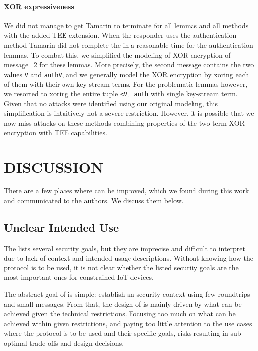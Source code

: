 \documentclass[runningheads]{llncs}
\begin{document}
\paragraph{XOR expressiveness}
We did not manage to get Tamarin to terminate for all lemmas and all methods
with the added TEE extension.
%
When the responder uses the \mStat{} authentication method Tamarin did not
complete the in a reasonable time for the authentication lemmas.
%
To combat this, we simplified the modeling of XOR encryption of message\_2 for
these lemmas.
%
More precisely, the second message contains the two values \verb|V| and
\verb|authV|, and we generally model the XOR encryption by xoring each of them
with their own key-stream terms.
%
For the problematic lemmas however, we resorted to xoring the entire tuple
\verb|<V, auth| with single key-stream term.
%
Given that no attacks were identified using our original modeling, this
simplification is intuitively not a severe restriction.
%
However, it is possible that we now miss attacks on these methods 
combining properties of the two-term XOR encryption with TEE capabilities.
%

\section{\uppercase{Discussion}}
\label{sec:discussion}
There are a few places where \mEdhoc{} can be improved,
which we found during this work and communicated to the authors.
%
We discuss them below.
%

\subsection{Unclear Intended Use}
\label{sec:unclearProtocolUse}
%
The \mEdhoc{} \mSpec{} lists several security goals, but they are
imprecise and difficult to interpret due to lack of context and intended usage
descriptions.
%
Without knowing how the protocol is to be used,
it is not clear whether the listed security goals are the most important ones
for constrained IoT devices.
%

The abstract goal of \mEdhoc{} is simple: establish an \mOscore{} security
context using few roundtrips and small messages.
%
From that, the design of \mEdhoc{} is mainly driven by what
can be achieved given the technical restrictions.
%
Focusing too much on what can be achieved within given restrictions, and paying
too little attention to the use cases where the
protocol is to be used and their specific goals, risks resulting in
sub-optimal trade-offs and design decisions.
%
\end{document}
